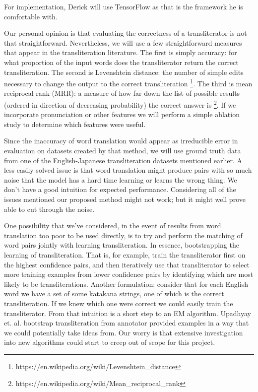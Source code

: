 \documentclass{article}
\begin{document}
For implementation,
Derick will use TensorFlow as that is the framework he is comfortable with.

Our personal opinion is that evaluating the correctness
of a transliterator is not that straightforward.
Nevertheless,
we will use a few straightforward measures
that appear in the transliteration literature.
The first is simply accuracy:
for what proportion of the input words
does the transliterator return the correct transliteration.
The second is Levenshtein distance:
the number of simple edits necessary to change the output to
the correct transliteration
\footnote{https://en.wikipedia.org/wiki/Levenshtein\_distance}.
The third is mean reciprocal rank (MRR):
a measure of how far down the list of possible results
(ordered in direction of decreasing probability)
the correct answer is
\footnote{https://en.wikipedia.org/wiki/Mean\_reciprocal\_rank}.
If we incorporate pronunciation or other features
we will perform a simple ablation study
to determine which features were useful.

Since the inaccuracy of word translation would appear as irreducible error
in evaluation on datasets created by that method,
we will use ground truth data
from one of the English-Japanese transliteration datasets mentioned earlier.
A less easily solved issue is that
word translation might produce pairs with so much noise
that the model has a hard time learning or learns the wrong thing.
We don't have a good intuition for expected performance.
Considering all of the issues mentioned our proposed method might not work;
but it might well prove able to cut through the noise.

One possibility that we've considered,
in the event of results from word translation too poor to be used directly,
is to try and perform the matching of word pairs
jointly with learning transliteration.
In essence, bootstrapping the learning of transliteration.
That is,
for example,
train the transliterator first on the highest confidence pairs,
and then iteratively use that transliterator
to select more training examples from lower confidence pairs
by identifying which are most likely to be transliterations.
Another formulation:
consider that for each English word
we have a set of some katakana strings,
one of which is the correct transliteration.
If we knew which one were correct we could easily train the transliterator.
From that intuition is a short step to an EM algorithm.
Upadhyay et. al. \cite{Upadhyay2018BootstrappingTW}
bootstrap transliteration from annotator provided examples
in a way that we could potentially take ideas from.
Our worry is that extensive investigation into new algorithms
could start to creep out of scope for this project.
\end{document}
